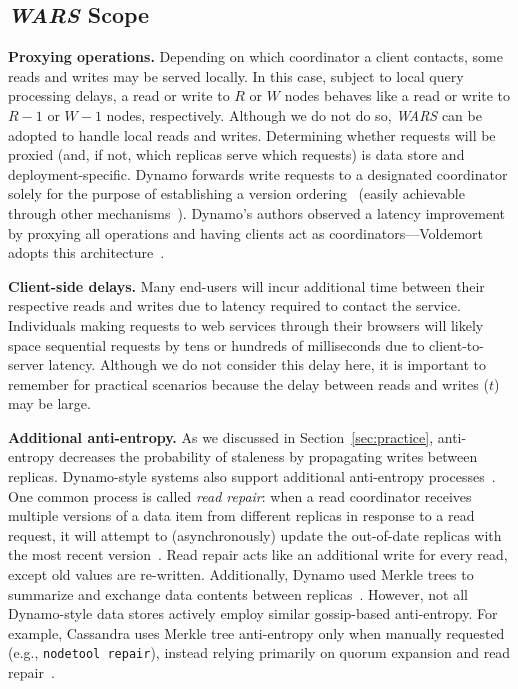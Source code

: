 \documentclass{vldb}
\newcommand{\subsectionskip}{-0em}
\begin{document}
\vspace{\subsectionskip}\subsection{{\large \textit{WARS}} Scope}
\label{sec:anti-entropy}

\textbf{Proxying operations.} Depending on which coordinator a client
contacts, some reads and writes may be served locally.  In this case,
subject to local query processing delays, a read or write to $R$ or
$W$ nodes behaves like a read or write to $R-1$ or $W-1$ nodes,
respectively.  Although we do not do so, \textit{WARS} can be adopted
to handle local reads and writes.  Determining whether requests will
be proxied (and, if not, which replicas serve which requests) is data
store and deployment-specific.  Dynamo forwards write requests to a
designated coordinator solely for the purpose of establishing a
version ordering~\cite[Section 6.4]{dynamo} (easily achievable through
other mechanisms~\cite{zookeeper}).  Dynamo's authors observed a
latency improvement by proxying all operations and having clients act
as coordinators---Voldemort adopts this
architecture~\cite{voldemortclient}.

\textbf{Client-side delays.} Many end-users will incur additional time
between their respective reads and writes due to latency required to
contact the service.  Individuals making requests to web services
through their browsers will likely space sequential requests by tens
or hundreds of milliseconds due to client-to-server latency.  Although
we do not consider this delay here, it is important to remember for
practical scenarios because the delay between reads and writes ($t$)
may be large.

\textbf{Additional anti-entropy.} As we discussed in
Section~\ref{sec:practice}, anti-entropy decreases the probability of
staleness by propagating writes between replicas.
Dynamo-style systems also support additional anti-entropy
processes~\cite{nosql}.  One common process is called \textit{read
  repair}: when a read coordinator receives multiple versions of a
data item from different replicas in response to a read request, it
will attempt to (asynchronously) update the out-of-date replicas with
the most recent version~\cite[Section 5]{dynamo}.  Read repair acts
like an additional write for every read, except old values are
re-written.  Additionally, Dynamo used Merkle trees to summarize and
exchange data contents between replicas~\cite[Section 4.7]{dynamo}.
However, not all Dynamo-style data stores actively employ similar
gossip-based anti-entropy.  For example, Cassandra uses Merkle tree
anti-entropy only when manually requested (e.g., \texttt{nodetool
  repair}), instead relying primarily on quorum expansion and read
repair~\cite{cassandra-merkle}.
\end{document}
